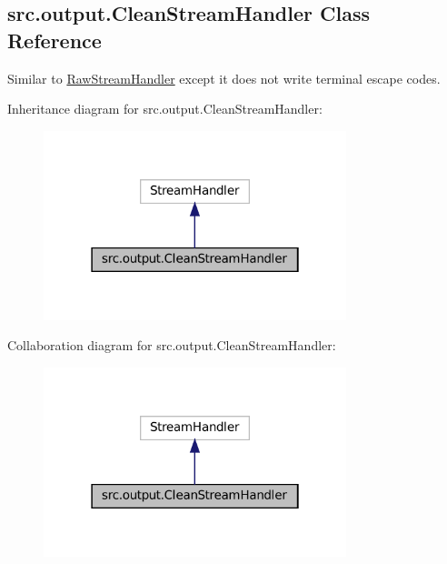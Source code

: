 \hypertarget{classsrc_1_1output_1_1CleanStreamHandler}{}\subsection{src.\+output.\+Clean\+Stream\+Handler Class Reference}
\label{classsrc_1_1output_1_1CleanStreamHandler}


Similar to \hyperlink{classsrc_1_1output_1_1RawStreamHandler}{Raw\+Stream\+Handler} except it does not write terminal escape codes.  




Inheritance diagram for src.\+output.\+Clean\+Stream\+Handler\+:
\nopagebreak
\begin{figure}[H]
\begin{center}
\leavevmode
\includegraphics[width=250pt]{classsrc_1_1output_1_1CleanStreamHandler__inherit__graph}
\end{center}
\end{figure}


Collaboration diagram for src.\+output.\+Clean\+Stream\+Handler\+:
\nopagebreak
\begin{figure}[H]
\begin{center}
\leavevmode
\includegraphics[width=250pt]{classsrc_1_1output_1_1CleanStreamHandler__coll__graph}
\end{center}
\end{figure}
